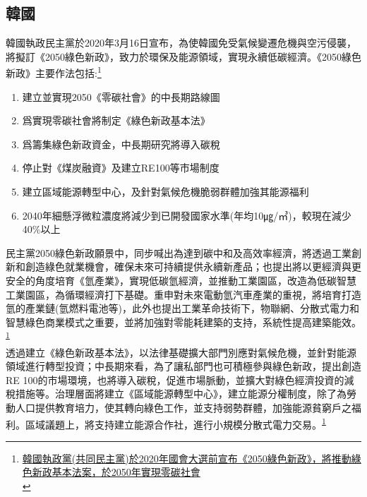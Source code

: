 \documentclass[a4paper,12pt]{article}
\begin{document}
\subsection{韓國}
\label{sec:org7dc7e4e}
韓國執政民主黨於2020年3月16日宣布，為使韓國免受氣候變遷危機與空污侵襲，將擬訂《2050綠色新政》，致力於環保及能源領域，實現永續低碳經濟。《2050綠色新政》主要作法包括:\footnote{\href{https://km.twenergy.org.tw/Data/db\_more?id=3758}{韓國執政黨(共同民主黨)於2020年國會大選前宣布《2050綠色新政》，將推動綠色新政基本法案，於2050年實現零碳社會}\\\label{org2aa1708}}\\
\begin{enumerate}
\item 建立並實現2050《零碳社會》的中長期路線圖\\
\item 爲實現零碳社會將制定《綠色新政基本法》\\
\item 爲籌集綠色新政資金，中長期研究將導入碳稅\\
\item 停止對《煤炭融資》及建立RE100等市場制度\\
\item 建立區域能源轉型中心，及針對氣候危機脆弱群體加強其能源福利\\
\item 2040年細懸浮微粒濃度將減少到已開發國家水準(年均10㎍/㎥)，較現在減少40\%以上\\
\end{enumerate}

民主黨2050綠色新政願景中，同步喊出為達到碳中和及高效率經濟，將透過工業創新和創造綠色就業機會，確保未來可持續提供永續新產品；也提出將以更經濟與更安全的角度培育《氫產業》，實現低碳氫經濟，並推動工業園區，改造為低碳智慧工業園區，為循環經濟打下基礎。重申對未來電動氫汽車產業的重視，將培育打造氫的產業鏈(氫燃料電池等)，此外也提出工業革命技術下，物聯網、分散式電力和智慧綠色商業模式之重要，並將加強對零能耗建築的支持，系統性提高建築能效。\textsuperscript{\ref{org2aa1708}}\\

透過建立《綠色新政基本法》，以法律基礎擴大部門別應對氣候危機，並針對能源領域進行轉型投資；中長期來看，為了讓私部門也可積極參與綠色新政，提出創造RE 100的市場環境，也將導入碳稅，促進市場脈動，並擴大對綠色經濟投資的減稅措施等。治理層面將建立《區域能源轉型中心》，建立能源分權制度，除了為勞動人口提供教育培力，使其轉向綠色工作，並支持弱勢群體，加強能源貧窮戶之福利。區域議題上，將支持建立能源合作社，進行小規模分散式電力交易。\textsuperscript{\ref{org2aa1708}}\\
\end{document}
